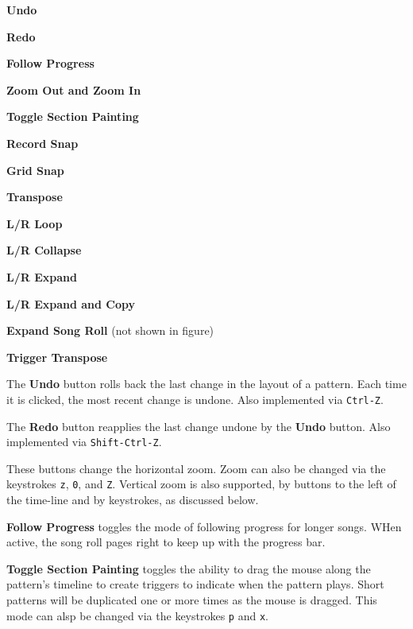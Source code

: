    \begin{enumber}
      \item \textbf{Undo}
      \item \textbf{Redo}
      \item \textbf{Follow Progress}
      \item \textbf{Zoom Out and Zoom In}
      \item \textbf{Toggle Section Painting}
      \item \textbf{Record Snap}
      \item \textbf{Grid Snap}
      \item \textbf{Transpose}
      \item \textbf{L/R Loop}
      \item \textbf{L/R Collapse}
      \item \textbf{L/R Expand}
      \item \textbf{L/R Expand and Copy}
      \item \textbf{Expand Song Roll} (not shown in figure)
      \item \textbf{Trigger Transpose}
   \end{enumber}

   \setcounter{ItemCounter}{0}      %

   The \textbf{Undo} button rolls back the last change in the layout of a
   pattern.  Each time it is clicked, the most recent change is undone.
   Also implemented via \texttt{Ctrl-Z}.

   The \textbf{Redo} button reapplies the last change undone by
   the \textbf{Undo} button.
   Also implemented via \texttt{Shift-Ctrl-Z}.

   These buttons change the horizontal zoom.
   Zoom can also be changed via the keystrokes \texttt{z}, \texttt{0},
   and \texttt{Z}.
   Vertical zoom is also supported, by buttons to the left of the time-line and
   by keystrokes, as discussed below.

   \textbf{Follow Progress} toggles the mode of following progress
   for longer songs.  WHen active, the song roll pages right to keep up with
   the progress bar.

   \textbf{Toggle Section Painting} toggles the ability
   to drag the mouse along the pattern's timeline to create triggers
   to indicate when the pattern plays.
   Short patterns will be duplicated one or more times as
   the mouse is dragged.
   This mode can alsp be changed via the keystrokes \texttt{p} and
   \texttt{x}.


